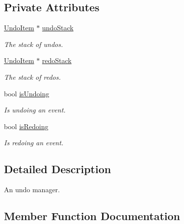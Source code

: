 \subsection*{Private Attributes}
\begin{DoxyCompactItemize}
\item 
\mbox{\label{classCSUndoManager_a9106500b4517e3608235a4ea6b35f03e}} 
\hyperlink{classCSUndoManager_1_1UndoItem}{Undo\+Item} $\ast$ \hyperlink{classCSUndoManager_a9106500b4517e3608235a4ea6b35f03e}{undo\+Stack}
\begin{DoxyCompactList}\small\item\em The stack of undos. \end{DoxyCompactList}\item 
\mbox{\label{classCSUndoManager_a4245926b269d6471833384272d52ae79}} 
\hyperlink{classCSUndoManager_1_1UndoItem}{Undo\+Item} $\ast$ \hyperlink{classCSUndoManager_a4245926b269d6471833384272d52ae79}{redo\+Stack}
\begin{DoxyCompactList}\small\item\em The stack of redos. \end{DoxyCompactList}\item 
bool \hyperlink{classCSUndoManager_ace8ec35440a0d96267d659135dcf0c39}{is\+Undoing}
\begin{DoxyCompactList}\small\item\em Is undoing an event. \end{DoxyCompactList}\item 
bool \hyperlink{classCSUndoManager_ad1087a3d4480bba871ac58935f4efd95}{is\+Redoing}
\begin{DoxyCompactList}\small\item\em Is redoing an event. \end{DoxyCompactList}\end{DoxyCompactItemize}


\subsection{Detailed Description}
An undo manager. 

\subsection{Member Function Documentation}
\mbox{\label{classCSUndoManager_af8b0d7f2acb9d6686cd030e1cef1640e}} 
